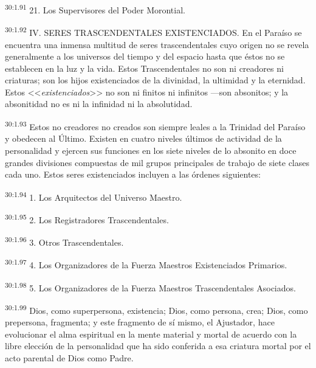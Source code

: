 \par
\textsuperscript{30:1.91} 21. Los Supervisores del Poder Morontial.

\par
\textsuperscript{30:1.92} IV. SERES TRASCENDENTALES EXISTENCIADOS. En el Paraíso se encuentra una inmensa multitud de seres trascendentales cuyo origen no se revela generalmente a los universos del tiempo y del espacio hasta que éstos no se establecen en la luz y la vida. Estos Trascendentales no son ni creadores ni criaturas; son los hijos existenciados de la divinidad, la ultimidad y la eternidad. Estos <<\textit{existenciados}>> no son ni finitos ni infinitos ---son absonitos; y la absonitidad no es ni la infinidad ni la absolutidad.

\par
\textsuperscript{30:1.93} Estos no creadores no creados son siempre leales a la Trinidad del Paraíso y obedecen al Último. Existen en cuatro niveles últimos de actividad de la personalidad y ejercen sus funciones en los siete niveles de lo absonito en doce grandes divisiones compuestas de mil grupos principales de trabajo de siete clases cada uno. Estos seres existenciados incluyen a las órdenes siguientes:

\par
\textsuperscript{30:1.94} 1. Los Arquitectos del Universo Maestro.

\par
\textsuperscript{30:1.95} 2. Los Registradores Trascendentales.

\par
\textsuperscript{30:1.96} 3. Otros Trascendentales.

\par
\textsuperscript{30:1.97} 4. Los Organizadores de la Fuerza Maestros Existenciados Primarios.

\par
\textsuperscript{30:1.98} 5. Los Organizadores de la Fuerza Maestros Trascendentales Asociados.

\par
\textsuperscript{30:1.99} Dios, como superpersona, existencia; Dios, como persona, crea; Dios, como prepersona, fragmenta; y este fragmento de sí mismo, el Ajustador, hace evolucionar el alma espiritual en la mente material y mortal de acuerdo con la libre elección de la personalidad que ha sido conferida a esa criatura mortal por el acto parental de Dios como Padre.

